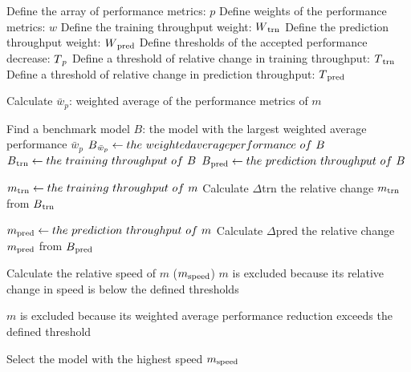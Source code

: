 \begin{algorithm*}
\caption{The Cost-effective Model Selection Algorithm}
\label{alg:model-selection}
\small
\begin{algorithmic}[1]
    \State Define the array of performance metrics: $p$
    \State Define weights of the performance metrics: $w$
    \State Define the training throughput weight: $W\textsubscript{trn}$
    \State Define the prediction throughput weight: $W\textsubscript{pred}$
    \State Define thresholds of the accepted performance decrease: $T\textsubscript{$p$}$
    \State Define a threshold of relative change in training throughput: $T\textsubscript{trn}$
    \State Define a threshold of relative change in prediction throughput: $T\textsubscript{pred}$
    
        \State Calculate $\bar{w}_p$: weighted average of the performance metrics of $m$ 
    \EndFor
    
    \State Find a benchmark model $B$: the model with the largest weighted average performance $\bar{w}_p$ 
    \State $B\textsubscript{$\bar{w}_p$} \gets the\ weighted average performance\ of\ B$
    \State $B\textsubscript{trn} \gets the\ training\ throughput\ of\ B$
    \State $B\textsubscript{pred} \gets the\ prediction\ throughput\ of\ B$
    
                
            
            \State $m\textsubscript{trn} \gets the\ training\ throughput\ of\ m$
            \State Calculate $\Delta$trn the relative change $m\textsubscript{trn}$ from $B\textsubscript{trn}$ 
            
            \State $m\textsubscript{pred} \gets the\ prediction\ throughput\ of\ m$
            \State Calculate $\Delta$pred the relative change $m\textsubscript{pred}$ from $B\textsubscript{pred}$ 
            
                \State Calculate the relative speed of $m$ ($m\textsubscript{speed}$) 
            \Else
                \State $m$ is excluded because its relative change in speed is below the defined thresholds                
            \EndIf
            
        \Else
             \State $m$ is excluded because its weighted average performance reduction exceeds the defined threshold
        \EndIf
    \EndFor
        
    \State Select the model with the highest speed $m\textsubscript{speed}$
    
\end{algorithmic}
\end{algorithm*}

